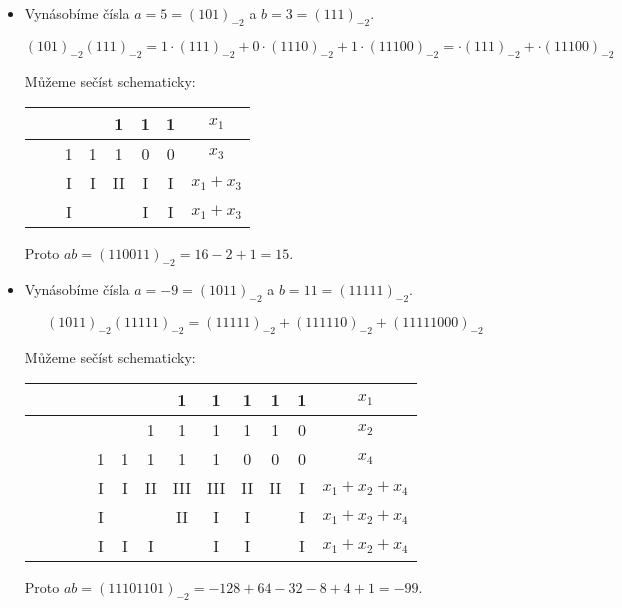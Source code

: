 \documentclass[12pt]{book}
\begin{document}
\begin{itemize}
  \item Vynásobíme čísla $a = 5 = (101)_{-2}$ a $b = 3 = (111)_{-2}$.
  
  $$(101)_{-2} (111)_{-2} = 1\cdot(111)_{-2} + 0 \cdot(1110)_{-2} + 1\cdot (11100)_{-2} = \cdot(111)_{-2} + \cdot (11100)_{-2}$$
  
  Můžeme sečíst schematicky:
  

 \begin{tabular}{|c|c|c|c|c|c|c|c|}
   \hline
    &  &   &   & 1 & 1 & 1 & $x_1$ \\ \hline
    &  & 1 & 1 & 1 & 0 & 0 & $x_3$ \\ \hline \hline
    &  & I & I &II & I & I & $x_1 + x_3$ \\ \hline
    &  & I &   &   & I & I & $x_1 + x_3$  \\ \hline
 \end{tabular}

   
  Proto $ab = (110011)_{-2} = 16 - 2 + 1 = 15$.
  
  \item Vynásobíme čísla $a = -9 = (1011)_{-2}$ a $b = 11 = (11111)_{-2}$.

  $$(1011)_{-2}(11111)_{-2} = (11111)_{-2} + (111110)_{-2} + (11111000)_{-2}$$

  Můžeme sečíst schematicky:

    
 \begin{tabular}{|c|c|c|c|c|c|c|c|c|c|c|c|c|}
   \hline
    &  &  &  &   &   &   & 1 & 1 & 1 & 1 & 1 & $x_1$ \\ \hline
    &  &  &  &   &   & 1 & 1 & 1 & 1 & 1 & 0 & $x_2$  \\ \hline
    &  &  &  & 1 & 1 & 1 & 1 & 1 & 0 & 0 & 0 & $x_4$  \\ \hline \hline
    &  &  &  & I & I  &II&III&III& II& II& I & $x_1 + x_2 + x_4$  \\ \hline
    &  &  &  & I &    &  &II &I  & I &   & I & $x_1 + x_2 + x_4$ \\ \hline
    &  &  &  & I & I  & I&   &I  & I &   & I & $x_1 + x_2 + x_4$ \\ \hline
 \end{tabular}

  Proto $ab = (11101101)_{-2} = -128 + 64 - 32 -8 + 4 + 1 = - 99$.
\end{itemize}
\end{document}
